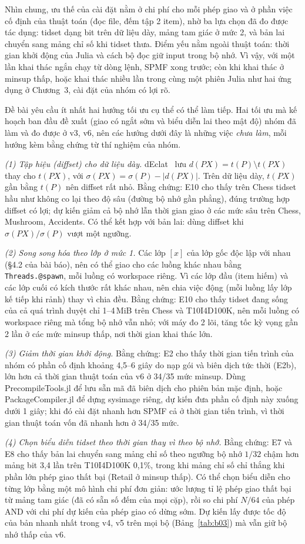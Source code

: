 Nhìn chung, ưu thế của cài đặt nằm ở chi phí cho mỗi phép giao và ở phần việc cố định của thuật toán (đọc file, đếm tập 2 item), nhờ ba lựa chọn đã đo được tác dụng: tidset dạng bit trên dữ liệu dày, mảng tam giác ở mức 2, và bản lai chuyển sang mảng chỉ số khi tidset thưa. Điểm yếu nằm ngoài thuật toán: thời gian khởi động của Julia và cách bộ đọc giữ input trong bộ nhớ. Vì vậy, với một lần khai thác ngắn chạy từ dòng lệnh, SPMF xong trước; còn khi khai thác ở minsup thấp, hoặc khai thác nhiều lần trong cùng một phiên Julia như hai ứng dụng ở Chương~3, cài đặt của nhóm có lợi rõ.

Đề bài yêu cầu ít nhất hai hướng tối ưu cụ thể có thể làm tiếp. Hai tối ưu mà kế hoạch ban đầu đề xuất (giao có ngắt sớm và biểu diễn lai theo mật độ) nhóm đã làm và đo được ở v3, v6, nên các hướng dưới đây là những việc \emph{chưa làm}, mỗi hướng kèm bằng chứng từ thí nghiệm của nhóm.

\emph{(1) Tập hiệu (diffset) cho dữ liệu dày.} dEclat~\cite{zaki2003fast} lưu $d(PX) = t(P) \setminus t(PX)$ thay cho $t(PX)$, với $\sigma(PX) = \sigma(P) - |d(PX)|$. Trên dữ liệu dày, $t(PX)$ gần bằng $t(P)$ nên diffset rất nhỏ. Bằng chứng: E10 cho thấy trên Chess tidset hầu như không co lại theo độ sâu (đường bộ nhớ gần phẳng), đúng trường hợp diffset có lợi; dự kiến giảm cả bộ nhớ lẫn thời gian giao ở các mức sâu trên Chess, Mushroom, Accidents. Có thể kết hợp với bản lai: dùng diffset khi $\sigma(PX)/\sigma(P)$ vượt một ngưỡng.

\emph{(2) Song song hóa theo lớp ở mức 1.} Các lớp $[x]$ của lớp gốc độc lập với nhau (§4.2 của bài báo), nên có thể giao cho các luồng khác nhau bằng \texttt{Threads.@spawn}, mỗi luồng có workspace riêng. Vì các lớp đầu (item hiếm) và các lớp cuối có kích thước rất khác nhau, nên chia việc động (mỗi luồng lấy lớp kế tiếp khi rảnh) thay vì chia đều. Bằng chứng: E10 cho thấy tidset đang sống của cả quá trình duyệt chỉ 1--4\,MiB trên Chess và T10I4D100K, nên mỗi luồng có workspace riêng mà tổng bộ nhớ vẫn nhỏ; với máy đo 2 lõi, tăng tốc kỳ vọng gần 2 lần ở các mức minsup thấp, nơi thời gian khai thác lớn.

\emph{(3) Giảm thời gian khởi động.} Bằng chứng: E2 cho thấy thời gian tiến trình của nhóm có phần cố định khoảng 4,5--6 giây do nạp gói và biên dịch tức thời (E2b), lớn hơn cả thời gian thuật toán của v6 ở 34/35 mức minsup. Dùng PrecompileTools.jl để lưu sẵn mã đã biên dịch cho phiên bản mặc định, hoặc PackageCompiler.jl để dựng sysimage riêng, dự kiến đưa phần cố định này xuống dưới 1 giây; khi đó cài đặt nhanh hơn SPMF cả ở thời gian tiến trình, vì thời gian thuật toán vốn đã nhanh hơn ở 34/35 mức.

\emph{(4) Chọn biểu diễn tidset theo thời gian thay vì theo bộ nhớ.} Bằng chứng: E7 và E8 cho thấy bản lai chuyển sang mảng chỉ số theo ngưỡng bộ nhớ $1/32$ chậm hơn mảng bit 3,4 lần trên T10I4D100K 0,1\%, trong khi mảng chỉ số chỉ thắng khi phần lớn phép giao thất bại (Retail ở minsup thấp). Có thể chọn biểu diễn cho từng lớp bằng một mô hình chi phí đơn giản: ước lượng tỉ lệ phép giao thất bại từ mảng tam giác (đã có sẵn số đếm của mọi cặp), rồi so chi phí $N/64$ của phép AND với chi phí dự kiến của phép giao có dừng sớm. Dự kiến lấy được tốc độ của bản nhanh nhất trong v4, v5 trên mọi bộ (Bảng~\ref{tab:b03}) mà vẫn giữ bộ nhớ thấp của v6.

